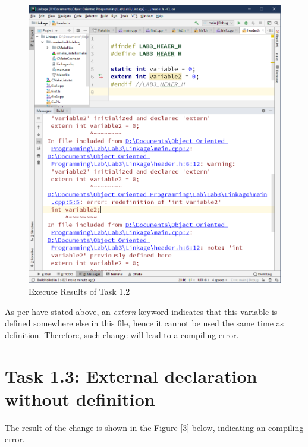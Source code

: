 \documentclass[a4paper]{report}
\begin{document}
\begin{figure}
  \centering
  \includegraphics[scale=0.5]{Onetow.PNG}
  \caption{Execute Results of Task 1.2}\label{2}
\end{figure}


As per have stated above, an \emph{extern} keyword indicates that this variable is defined somewhere else in this file, hence it cannot be used the same time as definition. Therefore, such change will lead to a compiling error.
\section{Task 1.3: External declaration without definition}

The result of the change is shown in the Figure \ref{3} below, indicating an compiling error.
\end{document}
